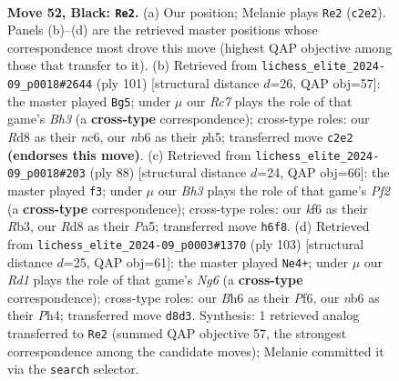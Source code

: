 \documentclass[11pt]{article}
\begin{document}
\clearpage

\begin{figure}[p]\centering
\begin{subfigure}{0.46\textwidth}\centering
\resizebox{\linewidth}{!}{%
\newchessgame
\chessboard[
  setfen={3r4/1p5k/1N3Kpb/5p1p/P7/6PP/2r5/8 b - - 1 52},
  showmover=false,
  pgfstyle=straightmove, color=movearrow, markmove={c2-e2}
]}
\caption{}
\end{subfigure}\hfill
\begin{subfigure}{0.46\textwidth}\centering
\resizebox{\linewidth}{!}{%
\newchessgame
\chessboard[
  setfen={8/8/p1N4b/P6P/2P2k2/2P2p2/4pK2/8 b - - 1 51},
  showmover=false,
  pgfstyle=straightmove, color=movearrow, markmove={h6-g5}
]}
\caption{}
\end{subfigure}
\\[4pt]
\begin{subfigure}{0.46\textwidth}\centering
\resizebox{\linewidth}{!}{%
\newchessgame
\chessboard[
  setfen={2r5/5p2/p3p3/P2n2kP/1p4P1/1R6/5PK1/8 w - - 3 45},
  showmover=false,
  pgfstyle=straightmove, color=movearrow, markmove={f2-f3}
]}
\caption{}
\end{subfigure}\hfill
\begin{subfigure}{0.46\textwidth}\centering
\resizebox{\linewidth}{!}{%
\newchessgame
\chessboard[
  setfen={8/5k2/3Kpp2/3p4/3P1P1p/2P3n1/8/4N3 b - - 1 52},
  showmover=false,
  pgfstyle=straightmove, color=movearrow, markmove={g3-e4}
]}
\caption{}
\end{subfigure}
\caption{\textbf{Move 52, Black: \texttt{Re2}.} (a) Our position; Melanie plays \texttt{Re2} (\texttt{c2e2}). Panels (b)--(d) are the retrieved master positions whose correspondence most drove this move (highest QAP objective among those that transfer to it). (b) Retrieved from \texttt{lichess\_elite\_2024-09\_p0018\#2644} (ply 101) [structural distance $d$=26, QAP obj=57]: the master played \texttt{Bg5}; under $\mu$ our \emph{Rc7} plays the role of that game's \emph{Bh3} (a \textbf{cross-type} correspondence); cross-type roles: our \emph{R}d8 as their \emph{n}c6, our \emph{n}b6 as their \emph{p}h5; transferred move \texttt{c2e2} \textbf{(endorses this move)}. (c) Retrieved from \texttt{lichess\_elite\_2024-09\_p0018\#203} (ply 88) [structural distance $d$=24, QAP obj=66]: the master played \texttt{f3}; under $\mu$ our \emph{Bh3} plays the role of that game's \emph{Pf2} (a \textbf{cross-type} correspondence); cross-type roles: our \emph{k}f6 as their \emph{R}b3, our \emph{R}d8 as their \emph{P}a5; transferred move \texttt{h6f8}. (d) Retrieved from \texttt{lichess\_elite\_2024-09\_p0003\#1370} (ply 103) [structural distance $d$=25, QAP obj=61]: the master played \texttt{Ne4+}; under $\mu$ our \emph{Rd1} plays the role of that game's \emph{Ng6} (a \textbf{cross-type} correspondence); cross-type roles: our \emph{B}h6 as their \emph{P}f6, our \emph{n}b6 as their \emph{P}h4; transferred move \texttt{d8d3}. Synthesis: 1 retrieved analog transferred to \texttt{Re2} (summed QAP objective 57, the strongest correspondence among the candidate moves); Melanie committed it via the \texttt{search} selector.}
\label{fig:thought-m103}
\end{figure}
\end{document}
